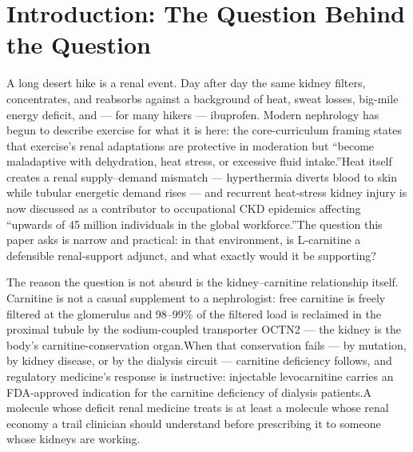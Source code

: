 \documentclass[11pt]{article}
\newcommand{\src}[1]{\allowbreak[#1]}
\begin{document}
\begin{abstract}
renal harm from oral carnitine at supplement doses in healthy people. The paper closes with the trail-clinic protocol: LCLT powder 2 g/day split with meals ($\sim$\$0.13/day), the four cautions (coumarin anticoagulants, thyroid-hormone replacement, seizure disorders, CKD), the water question answered plainly --- carnitine does not spare water, and hydration strategy remains the renal intervention that actually has evidence.
\end{abstract}

\section{Introduction: The Question Behind the Question}

A long desert hike is a renal event. Day after day the same kidney filters, concentrates, and reabsorbs against a background of heat, sweat losses, big-mile energy deficit, and --- for many hikers --- ibuprofen. Modern nephrology has begun to describe exercise for what it is here: the core-curriculum framing states that exercise's renal adaptations are protective in moderation but ``become maladaptive with dehydration, heat stress, or excessive fluid intake.''\src{175} Heat itself creates a renal supply--demand mismatch --- hyperthermia diverts blood to skin while tubular energetic demand rises --- and recurrent heat-stress kidney injury is now discussed as a contributor to occupational CKD epidemics affecting ``upwards of 45 million individuals in the global workforce.''\src{172}\src{169} The question this paper asks is narrow and practical: in that environment, is L-carnitine a defensible renal-support adjunct, and what exactly would it be supporting?

The reason the question is not absurd is the kidney--carnitine relationship itself. Carnitine is not a casual supplement to a nephrologist: free carnitine is freely filtered at the glomerulus and 98--99\% of the filtered load is reclaimed in the proximal tubule by the sodium-coupled transporter OCTN2 --- the kidney is the body's carnitine-conservation organ.\src{91} When that conservation fails --- by mutation, by kidney disease, or by the dialysis circuit --- carnitine deficiency follows, and regulatory medicine's response is instructive: injectable levocarnitine carries an FDA-approved indication for the carnitine deficiency of dialysis patients.\src{66} A molecule whose deficit renal medicine treats is at least a molecule whose renal economy a trail clinician should understand before prescribing it to someone whose kidneys are working.
\end{document}
